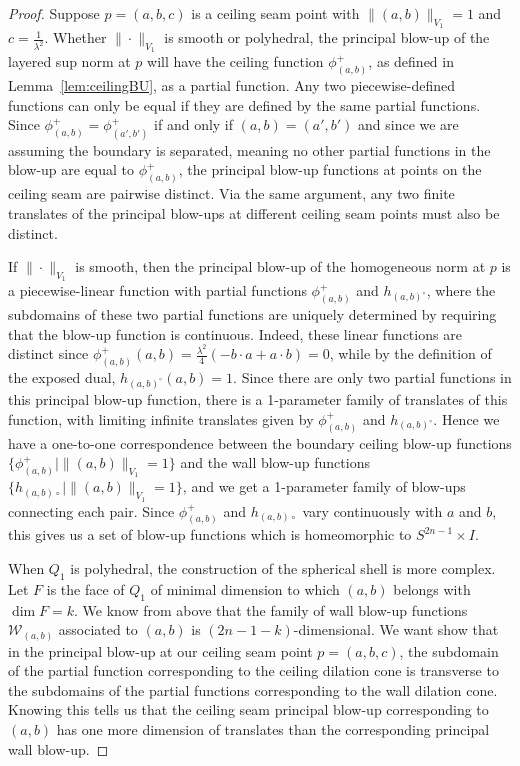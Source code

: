 \documentclass{article}
\theoremstyle{definition}
\newcommand{\norm}[1]{\|#1\|}
\begin{document}
\begin{proof}
Suppose $p = (a,b,c)$ is a ceiling seam point with $\norm{(a,b)}_{V_1} = 1$ and $c = \frac1{\lambda^2}$. Whether $\norm{\cdot}_{V_1}$ is smooth or polyhedral, the principal blow-up of the layered sup norm at $p$ will have the ceiling function $\phi^+_{(a,b)}$, as defined in Lemma~\ref{lem:ceilingBU}, as a partial function. Any two piecewise-defined functions can only be equal if they are defined by the same partial functions. Since $\phi^+_{(a,b)} = \phi^+_{(a',b')}$ if and only if $(a,b) = (a',b')$ and since we are assuming the boundary is separated, meaning no other partial functions in the blow-up are equal to $\phi^+_{(a,b)}$, the principal blow-up functions at points on the ceiling seam are pairwise distinct. Via the same argument, any two finite translates of the principal blow-ups at different ceiling seam points must also be distinct.


If $\norm{\cdot}_{V_1}$ is smooth, then the principal blow-up of the homogeneous norm at $p$ is a piecewise-linear function with partial functions $\phi^+_{(a,b)}$ and $h_{(a,b)^\circ}$, where the subdomains of these two partial functions are uniquely determined by requiring that the blow-up function is continuous. Indeed, these linear functions are distinct since
$\phi^+_{(a,b)}(a,b) = \frac{\lambda^2}4(-b\cdot a + a \cdot b) = 0$, while by the definition of the exposed dual, $h_{(a,b)^\circ}(a,b) = 1.$
Since there are only two partial functions in this principal blow-up function, there is a 1-parameter family of translates of this function, with limiting infinite translates given by $\phi^+_{(a,b)}$ and $h_{(a,b)^\circ}$. Hence we have a one-to-one correspondence between the boundary ceiling blow-up functions $\{\phi^+_{(a,b)}\mid \norm{(a,b)}_{V_1} = 1\}$ and the wall blow-up functions $\{h_{(a,b)\circ}\mid \norm{(a,b)}_{V_1} = 1\}$, and we get a 1-parameter family of blow-ups connecting each pair. Since $\phi^+_{(a,b)}$ and $h_{(a,b)\circ}$ vary continuously with $a$ and $b$, this gives us a set of blow-up functions which is homeomorphic to $S^{2n-1}\times I$.


When $Q_1$ is polyhedral, the construction of the spherical shell is more complex. Let $F$ is the face of $Q_1$ of minimal dimension to which $(a,b)$ belongs with $\dim F = k$. We know from above that the family of wall blow-up functions $\mathcal W_{(a,b)}$ associated to $(a,b)$ is $(2n-1-k)$-dimensional. We want show that in the principal blow-up at our ceiling seam point $p = (a,b,c)$, the subdomain of the partial function corresponding to the ceiling dilation cone is transverse to the subdomains of the partial functions corresponding to the wall dilation cone. Knowing this tells us that the ceiling seam principal blow-up corresponding to $(a,b)$ has one more dimension of translates than the corresponding principal wall blow-up.


\end{proof}
\end{document}
